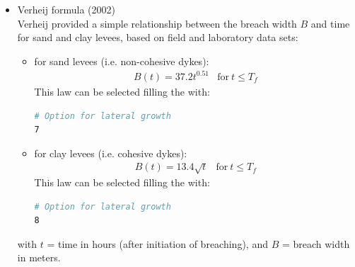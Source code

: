 \begin{itemize}
\item Verheij formula (2002) \\
Verheij \cite{Verheij2002} provided a simple relationship between the breach
width $B$ and time for sand and clay levees, based on field and laboratory data
sets:
\begin{itemize}
\item for sand levees (i.e. non-cohesive dykes):
\begin{equation}
\begin{array}{lc}
B(t)=37.2t^{0.51} & \text{for}~t\leq T_f
\end{array}
\end{equation}
This law can be selected filling the  with:
\begin{lstlisting}[language=bash]
# Option for lateral growth
7
\end{lstlisting}
\item for clay levees (i.e. cohesive dykes):
\begin{equation}
\begin{array}{lc}
B(t)=13.4\sqrt{t} & \text{for}~t\leq T_f
\end{array}
\end{equation}
This law can be selected filling the  with:
\begin{lstlisting}[language=bash]
# Option for lateral growth
8
\end{lstlisting}
\end{itemize}
with $t$ = time in hours (after initiation of breaching), and $B$ = breach width
in meters.


\end{itemize}
